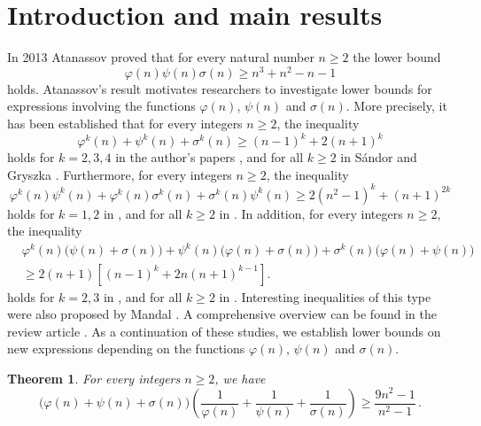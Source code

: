 \documentclass[12pt]{article}
\newtheorem{theorem}{Theorem}
\begin{document}
\section{Introduction and main results}
\indent

In 2013 Atanassov \cite{Atanassov2013} proved that for every natural number $n\geq2$ the lower bound
\begin{equation*}
\varphi(n)\psi(n)\sigma(n)\geq n^3+n^2-n-1
\end{equation*}
holds. Atanassov's result motivates researchers to investigate lower bounds for expressions involving the functions $\varphi(n)$, $\psi(n)$ and $\sigma(n)$.
More precisely, it has been established that for every integers $n\geq2$, the inequality 
\begin{equation*}
\varphi^k(n)+\psi^k(n)+\sigma^k(n)\geq (n-1)^k +2(n+1)^k
\end{equation*}
holds for $k=2, 3, 4$ in the author's papers \cite{Dimitrov2023, Dimitrov2024a}, and for all $k\geq2$ in S\'{a}ndor and Gryszka \cite{Sandor2025}.
Furthermore, for every integers $n\geq2$, the inequality 
\begin{equation*}
\varphi^k(n)\psi^k(n)+\varphi^k(n)\sigma^k(n)+\sigma^k(n)\psi^k(n)\geq 2(n^2-1)^k+(n+1)^{2k}
\end{equation*}
holds for $k=1, 2$ in \cite{Dimitrov2023, Dimitrov2024a}, and for all $k\geq2$ in \cite{Sandor2025}.
In addition, for every integers $n\geq2$, the inequality 
\begin{align*}
&\varphi^k(n)\big(\psi(n)+\sigma(n)\big)+\psi^k(n)\big(\varphi(n)+\sigma(n)\big)+\sigma^k(n)\big(\varphi(n)+\psi(n)\big)\\
&\geq 2(n+1)[(n-1)^k+2n(n+1)^{k-1}].
\end{align*}
holds for $k=2, 3$ in \cite{Dimitrov2024a}, and for all $k\geq2$ in \cite{Sandor2025}.
Interesting inequalities of this type were also proposed by Mandal \cite{Mandal}. 
A comprehensive overview can be found in the review article \cite{Dimitrov2024b}. 
As a continuation of these studies, we establish lower bounds on new expressions depending on the functions $\varphi(n)$, $\psi(n)$ and $\sigma(n)$.
\begin{theorem}\label{Theorem1}
For every integers $n\geq2$, we have
\begin{equation}\label{lowerbound1}
\big(\varphi(n)+\psi(n)+\sigma(n)\big)\left(\frac{1}{\varphi(n)}+\frac{1}{\psi(n)}+\frac{1}{\sigma(n)}\right)\geq\frac{9n^2-1}{n^2-1}\,.
\end{equation}
\end{theorem}
\end{document}
